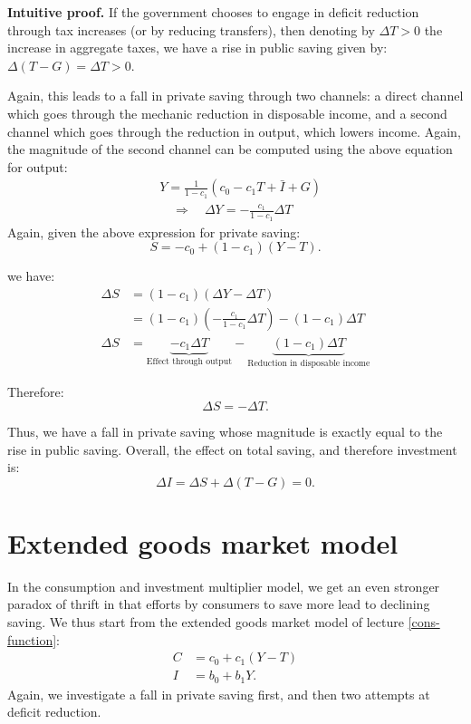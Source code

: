 \documentclass[]{book}
\theoremstyle{definition}
\theoremstyle{definition}
\theoremstyle{definition}
\theoremstyle{remark}
\begin{document}
\textbf{Intuitive proof.} If the government chooses to engage in deficit
reduction through tax increases (or by reducing transfers), then
denoting by \(\Delta T>0\) the increase in aggregate taxes, we have a
rise in public saving given by: \(\Delta(T-G)=\Delta T>0\).

Again, this leads to a fall in private saving through two channels: a
direct channel which goes through the mechanic reduction in disposable
income, and a second channel which goes through the reduction in output,
which lowers income. Again, the magnitude of the second channel can be
computed using the above equation for output: \[
\begin{aligned}
&Y=\frac{1}{1-c_{1}}\left(c_{0}-c_{1}T+\bar{I}+G\right)\\
&\quad\Rightarrow\quad\Delta Y=-\frac{c_{1}}{1-c_{1}}\Delta T
\end{aligned}
\] Again, given the above expression for private saving:
\[S=-c_{0}+\left(1-c_{1}\right)\left(Y-T\right).\]

we have: \[
\begin{aligned}
\Delta S    &=(1-c_{1})(\Delta Y-\Delta T)\\
    &=(1-c_{1})\left(-\frac{c_{1}}{1-c_{1}}\Delta T\right)-(1-c_{1})\Delta T\\
\Delta S    &=\underbrace{-c_{1}\Delta T}_{\text{Effect through output}}-\underbrace{(1-c_{1})\Delta T}_{\text{Reduction in disposable income}}
\end{aligned}
\]

Therefore: \[\Delta S=-\Delta T.\]

Thus, we have a fall in private saving whose magnitude is exactly equal
to the rise in public saving. Overall, the effect on total saving, and
therefore investment is: \[\Delta I  =\Delta S+\Delta(T-G)=0.\]

\section{Extended goods market model}\label{extended}

In the consumption and investment multiplier model, we get an even
stronger paradox of thrift in that efforts by consumers to save more
lead to declining saving. We thus start from the extended goods market
model of lecture \ref{cons-function}: \[
\begin{aligned}
C   &=c_{0}+c_{1}\left(Y-T\right)\\
I   &=b_{0}+b_{1}Y.
\end{aligned}
\] Again, we investigate a fall in private saving first, and then two
attempts at deficit reduction.
\end{document}
